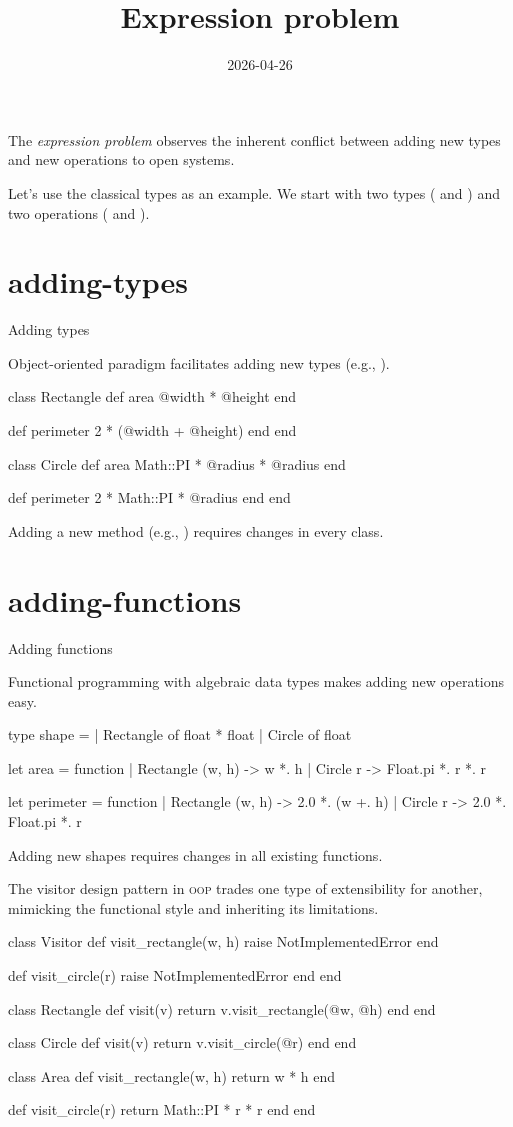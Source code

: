 \documentclass{note}
\title{Expression problem}
\date{2026-04-26}
\begin{document}
The \emph{expression problem} observes the inherent conflict between adding new types and new operations to open systems.

Let's use the classical  types as an example.
We start with two types ( and ) and two operations ( and ).

\section{adding-types}{Adding types}

Object-oriented paradigm facilitates adding new types (e.g., ).

\begin{code}[ruby]
class Rectangle
  def area
    @width * @height
  end

  def perimeter
    2 * (@width + @height)
  end
end

class Circle
  def area
    Math::PI * @radius * @radius
  end

  def perimeter
    2 * Math::PI * @radius
  end
end
\end{code}

Adding a new method (e.g., ) requires changes in every class.

\section{adding-functions}{Adding functions}

Functional programming with algebraic data types makes adding new operations easy.

\begin{code}[ocaml]
type shape =
  | Rectangle of float * float
  | Circle of float

let area = function
  | Rectangle (w, h) -> w *. h
  | Circle r -> Float.pi *. r *. r

let perimeter = function
  | Rectangle (w, h) -> 2.0 *. (w +. h)
  | Circle r -> 2.0 *. Float.pi *. r
\end{code}

Adding new shapes requires changes in all existing functions.

The visitor design pattern in \textsc{oop} trades one type of extensibility for another,
mimicking the functional style and inheriting its limitations.

\begin{code}[ruby]
class Visitor
  def visit\_rectangle(w, h)
    raise NotImplementedError
  end

  def visit\_circle(r)
    raise NotImplementedError
  end
end

class Rectangle
  def visit(v)
    return v.visit\_rectangle(@w, @h)
  end
end

class Circle
  def visit(v)
    return v.visit\_circle(@r)
  end
end

class Area
  def visit\_rectangle(w, h)
    return w * h
  end

  def visit\_circle(r)
    return Math::PI * r * r
  end
end
\end{code}
\end{document}
